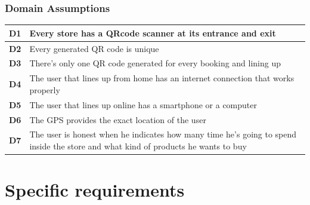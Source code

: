 \documentclass[]{article}
\begin{document}
	\subsubsection{Domain Assumptions}

		\begin{tabular}{|c|l|}
				\hline			
				\textbf{D1} & 
					\begin{minipage}[t]{13cm}
						Every store has a QRcode scanner at its entrance and exit
					\end{minipage}
				\\ \hline				
				\textbf{D2} & 
					\begin{minipage}[t]{13cm}
						Every generated QR code is unique
							\end{minipage}
				\\ \hline				
				\textbf{D3} & 
					\begin{minipage}[t]{13cm}
						There’s only one QR code generated for every booking and lining up
					\end{minipage}
				\\ \hline				
				\textbf{D4} & 
					\begin{minipage}[t]{13cm}
						The user that lines up from home has an internet connection that works properly
					\end{minipage}
				\\ \hline				
				\textbf{D5} & 
					\begin{minipage}[t]{13cm}
						The user that lines up online has a smartphone or a computer
					\end{minipage}
				\\ \hline				
				\textbf{D6} & 
					\begin{minipage}[t]{13cm}
						The GPS provides the exact location of the user
					\end{minipage}
				\\ \hline	
				\textbf{D7} & 
					\begin{minipage}[t]{13cm}
						The user is honest when he indicates how many time he’s going to spend inside the store and what kind of products he wants to buy
					\end{minipage}
				\\ \hline	
			\end{tabular}
			\newpage


	
	\section{Specific requirements}
	
\end{document}
